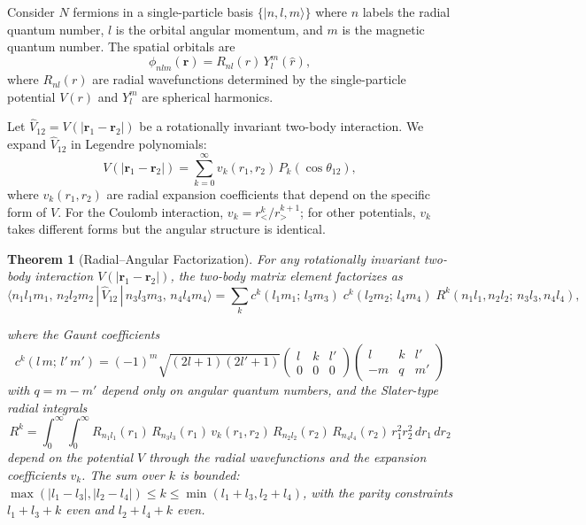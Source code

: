 \documentclass[twocolumn,pra,amsmath,amssymb,superscriptaddress]{revtex4-2}
\begin{document}
Consider $N$ fermions in a single-particle basis
$\{|n, l, m\rangle\}$ where $n$ labels the radial quantum number,
$l$ is the orbital angular momentum, and $m$ is the magnetic quantum
number.  The spatial orbitals are
\begin{equation}
  \phi_{nlm}(\mathbf{r}) = R_{nl}(r)\, Y_l^m(\hat{r}),
\end{equation}
where $R_{nl}(r)$ are radial wavefunctions determined by the
single-particle potential $V(r)$ and $Y_l^m$ are spherical
harmonics.

Let $\hat{V}_{12} = V(|\mathbf{r}_1 - \mathbf{r}_2|)$ be a
rotationally invariant two-body interaction.  We expand $\hat{V}_{12}$
in Legendre polynomials:
\begin{equation}
  V(|\mathbf{r}_1 - \mathbf{r}_2|)
  = \sum_{k=0}^{\infty} v_k(r_1, r_2)\, P_k(\cos\theta_{12}),
  \label{eq:legendre}
\end{equation}
where $v_k(r_1, r_2)$ are radial expansion coefficients that depend
on the specific form of $V$.  For the Coulomb interaction,
$v_k = r_<^k / r_>^{k+1}$; for other potentials, $v_k$ takes
different forms but the angular structure is identical.

\begin{widetext}
\noindent\textbf{Theorem 1} (Radial--Angular Factorization).
\textit{For any rotationally invariant two-body interaction $V(|\mathbf{r}_1 - \mathbf{r}_2|)$, the two-body matrix element factorizes as}
\begin{equation}
  \langle n_1 l_1 m_1,\, n_2 l_2 m_2 \,|\, \hat{V}_{12} \,|\, n_3 l_3 m_3,\, n_4 l_4 m_4 \rangle
  = \sum_k c^k(l_1 m_1;\, l_3 m_3)\; c^k(l_2 m_2;\, l_4 m_4)\; R^k(n_1 l_1, n_2 l_2;\, n_3 l_3, n_4 l_4),
  \label{eq:factorization}
\end{equation}
\end{widetext}
\textit{where the Gaunt coefficients}
\begin{equation}
  c^k(l\, m;\, l'\, m') = (-1)^m \sqrt{(2l+1)(2l'+1)}
  \begin{pmatrix} l & k & l' \\ 0 & 0 & 0 \end{pmatrix}
  \begin{pmatrix} l & k & l' \\ -m & q & m' \end{pmatrix}
  \label{eq:gaunt}
\end{equation}
\textit{with $q = m - m'$ depend only on angular quantum numbers, and
the Slater-type radial integrals}
\begin{equation}
  R^k = \int_0^\infty \!\!\int_0^\infty
  R_{n_1 l_1}(r_1)\, R_{n_3 l_3}(r_1)\,
  v_k(r_1, r_2)\,
  R_{n_2 l_2}(r_2)\, R_{n_4 l_4}(r_2)\,
  r_1^2 r_2^2\, dr_1\, dr_2
  \label{eq:slater}
\end{equation}
\textit{depend on the potential $V$ through the radial wavefunctions
and the expansion coefficients $v_k$.  The sum over $k$ is bounded:
$\max(|l_1 - l_3|, |l_2 - l_4|) \leq k \leq \min(l_1 + l_3, l_2 + l_4)$,
with the parity constraints $l_1 + l_3 + k$ even and $l_2 + l_4 + k$
even.}
\end{document}
